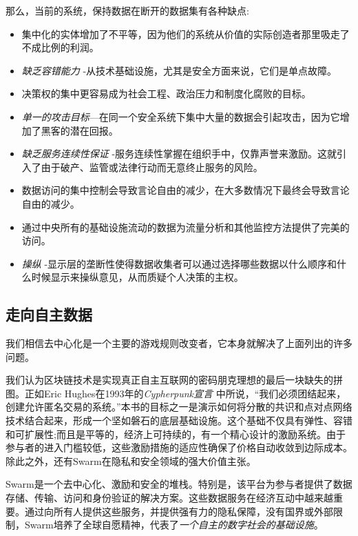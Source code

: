 那么，当前的系统，保持数据在断开的数据集有各种缺点: 

\begin{itemize}
    \item 集中化的实体增加了不平等，因为他们的系统从价值的实际创造者那里吸走了不成比例的利润。
    \item \emph{缺乏容错能力} -从技术基础设施，尤其是安全方面来说，它们是单点故障。
    \item 决策权的集中更容易成为社会工程、政治压力和制度化腐败的目标。
    \item \emph{单一的攻击目标}—在同一个安全系统下集中大量的数据会引起攻击，因为它增加了黑客的潜在回报。 
    \item \emph{缺乏服务连续性保证} -服务连续性掌握在组织手中，仅靠声誉来激励。这就引入了由于破产、监管或法律行动而无意终止服务的风险。
    \item 数据访问的集中控制会导致言论自由的减少，在大多数情况下最终会导致言论自由的减少。
    \item 通过中央所有的基础设施流动的数据为流量分析和其他监控方法提供了完美的访问。
    \item \emph{操纵} -显示层的垄断性使得数据收集者可以通过选择哪些数据以什么顺序和什么时候显示来操纵意见，从而质疑个人决策的主权。
\end{itemize}


\subsection{走向自主数据\statusgreen} \label{sec:selfsovereigndata}

我们相信去中心化是一个主要的游戏规则改变者，它本身就解决了上面列出的许多问题。

我们认为区块链技术是实现真正自主互联网的密码朋克理想的最后一块缺失的拼图。正如Eric Hughes在1993年的\emph{Cypherpunk宣言} \cite{hughes1993}中所说，“我们必须团结起来，创建允许匿名交易的系统。”本书的目标之一是演示如何将分散的共识和点对点网络技术结合起来，形成一个坚如磐石的底层基础设施。这个基础不仅具有弹性、容错和可扩展性;而且是平等的，经济上可持续的，有一个精心设计的激励系统。由于参与者的进入门槛较低，这些激励措施的适应性确保了价格自动收敛到边际成本。除此之外，还有Swarm在隐私和安全领域的强大价值主张。

Swarm是一个去中心化、激励和安全的堆栈。特别是，该平台为参与者提供了数据存储、传输、访问和身份验证的解决方案。这些数据服务在经济互动中越来越重要。通过向所有人提供这些服务，并提供强有力的隐私保障，没有国界或外部限制，Swarm培养了全球自愿精神，代表了\emph{一个自主的数字社会的基础设施}。

